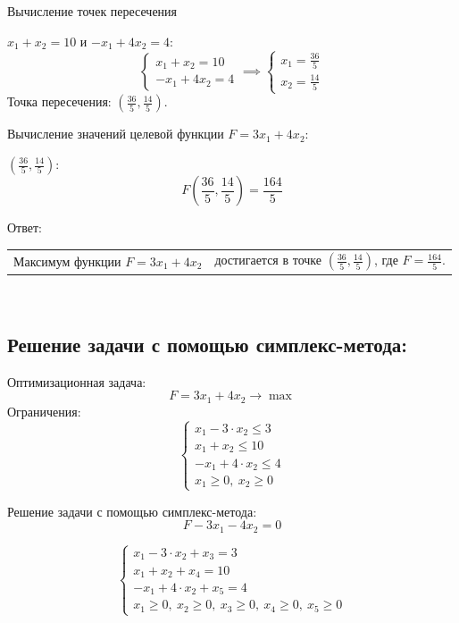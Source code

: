 \documentclass{article}
\begin{document}
Вычисление точек пересечения

\(x_1 + x_2 = 10\) и \(-x_1 + 4x_2 = 4\):
\[
    \begin{cases}
        x_1 + x_2 = 10 \\
        -x_1 + 4x_2 = 4
    \end{cases}
    \implies
    \begin{cases}
        x_1 = \frac{36}{5} \\
        x_2 = \frac{14}{5}
    \end{cases}
\]
Точка пересечения: \(\left(\frac{36}{5}, \frac{14}{5}\right)\).

Вычисление значений целевой функции \(F = 3x_1 + 4x_2\):

\(\left(\frac{36}{5}, \frac{14}{5}\right)\):
\[
    F\left(\frac{36}{5}, \frac{14}{5}\right) = \frac{164}{5}
\]

Ответ:
\begin{tabular}{l l}
    Максимум функции \(F = 3x_1 + 4x_2\) & достигается в точке \(\left(\frac{36}{5}, \frac{14}{5}\right)\), где \(F = \frac{164}{5}\).
\end{tabular}\\

\subsection{Решение задачи с помощью симплекс-метода:}

Оптимизационная задача:
\[
    F = 3x_1 + 4x_2 \to \max
\]
Ограничения:
\[
    \begin{cases}
        x_1 - 3 \cdot x_2 \leq 3  \\
        x_1 + x_2 \leq 10         \\
        -x_1 + 4 \cdot x_2 \leq 4 \\
        x_1 \geq 0, \ x_2 \geq 0
    \end{cases}
\]

Решение задачи с помощью симплекс-метода:
\[
    F - 3x_1 - 4x_2 = 0
\]

\[
    \begin{cases}
        x_1 - 3 \cdot x_2 + x_3 = 3  \\
        x_1 + x_2 + x_4 = 10         \\
        -x_1 + 4 \cdot x_2 + x_5 = 4 \\
        x_1 \geq 0, \ x_2 \geq 0, \ x_3 \geq 0, \ x_4 \geq 0, \ x_5 \geq 0
    \end{cases}
\]

\vspace{25pt}
\end{document}
